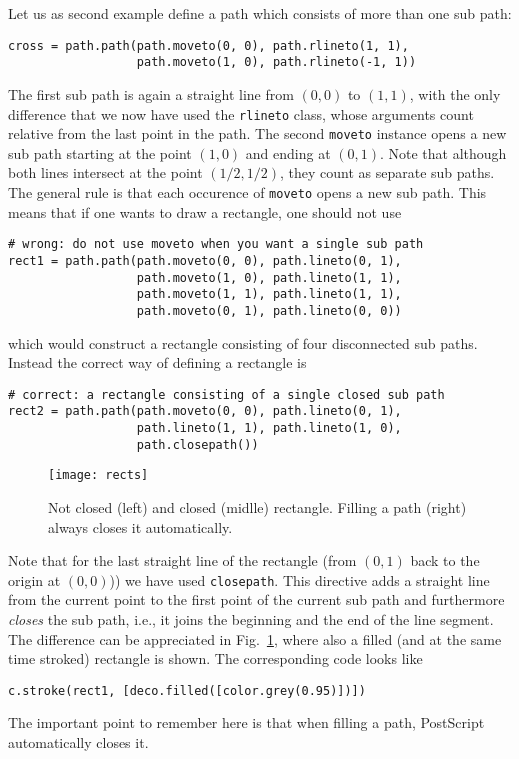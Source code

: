 Let us as second example define a path which consists of more than 
one sub path:
\begin{verbatim}
cross = path.path(path.moveto(0, 0), path.rlineto(1, 1),
                  path.moveto(1, 0), path.rlineto(-1, 1))
\end{verbatim}
The first sub path is again a straight line from $(0, 0)$ to $(1, 1)$,
with the only difference that we now have used the \verb|rlineto|
class, whose arguments count relative from the last point in the path.
The second \verb|moveto| instance opens a new sub path starting at the
point $(1, 0)$ and ending at $(0, 1)$. Note that although both lines
intersect at the point $(1/2, 1/2)$, they count as separate sub paths.
The general rule is that each occurence of \verb|moveto| opens a new
sub path. This means that if one wants to draw a rectangle, one should
not use
\begin{verbatim}
# wrong: do not use moveto when you want a single sub path
rect1 = path.path(path.moveto(0, 0), path.lineto(0, 1),
                  path.moveto(1, 0), path.lineto(1, 1),
                  path.moveto(1, 1), path.lineto(1, 1),
                  path.moveto(0, 1), path.lineto(0, 0))
\end{verbatim}
which would construct a rectangle consisting of four disconnected
sub paths. Instead the correct way of defining a rectangle is 
\begin{verbatim}
# correct: a rectangle consisting of a single closed sub path
rect2 = path.path(path.moveto(0, 0), path.lineto(0, 1), 
                  path.lineto(1, 1), path.lineto(1, 0),
                  path.closepath())
\end{verbatim}
%
\begin{figure}
\centerline{\texttt{[image: rects]}}
\caption{Not closed (left) and closed (midlle) rectangle. Filling a
  path (right) always closes it automatically.}
\label{fig:rects}
\end{figure}
Note that for the last straight line of the rectangle (from $(0, 1)$
back to the origin at $(0, 0)$)) we have used \verb|closepath|.  This
directive adds a straight line from the current point to the first
point of the current sub path and furthermore \textit{closes} the sub
path, i.e., it joins the beginning and the end of the line segment.
The difference can be appreciated in Fig.~\ref{fig:rects}, where
also a filled (and at the same time stroked) rectangle is shown.
The corresponding code looks like
\begin{verbatim}
c.stroke(rect1, [deco.filled([color.grey(0.95)])])
\end{verbatim}
The important point to remember here is that when filling a path, PostScript
automatically closes it.

